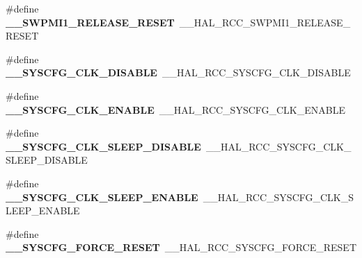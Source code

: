 \begin{DoxyCompactItemize}
\item 
\#define {\bfseries \+\_\+\+\_\+\+S\+W\+P\+M\+I1\+\_\+\+R\+E\+L\+E\+A\+S\+E\+\_\+\+R\+E\+S\+ET}~\+\_\+\+\_\+\+H\+A\+L\+\_\+\+R\+C\+C\+\_\+\+S\+W\+P\+M\+I1\+\_\+\+R\+E\+L\+E\+A\+S\+E\+\_\+\+R\+E\+S\+ET\hypertarget{group___h_a_l___r_c_c___aliased_ga7284a029f95a64809fe509d99fbce6f2}{}\label{group___h_a_l___r_c_c___aliased_ga7284a029f95a64809fe509d99fbce6f2}

\item 
\#define {\bfseries \+\_\+\+\_\+\+S\+Y\+S\+C\+F\+G\+\_\+\+C\+L\+K\+\_\+\+D\+I\+S\+A\+B\+LE}~\+\_\+\+\_\+\+H\+A\+L\+\_\+\+R\+C\+C\+\_\+\+S\+Y\+S\+C\+F\+G\+\_\+\+C\+L\+K\+\_\+\+D\+I\+S\+A\+B\+LE\hypertarget{group___h_a_l___r_c_c___aliased_gaf304a1951b4254ea8aa1ee909338cd55}{}\label{group___h_a_l___r_c_c___aliased_gaf304a1951b4254ea8aa1ee909338cd55}

\item 
\#define {\bfseries \+\_\+\+\_\+\+S\+Y\+S\+C\+F\+G\+\_\+\+C\+L\+K\+\_\+\+E\+N\+A\+B\+LE}~\+\_\+\+\_\+\+H\+A\+L\+\_\+\+R\+C\+C\+\_\+\+S\+Y\+S\+C\+F\+G\+\_\+\+C\+L\+K\+\_\+\+E\+N\+A\+B\+LE\hypertarget{group___h_a_l___r_c_c___aliased_gade2f257c0606454f62a43e92c9f4da16}{}\label{group___h_a_l___r_c_c___aliased_gade2f257c0606454f62a43e92c9f4da16}

\item 
\#define {\bfseries \+\_\+\+\_\+\+S\+Y\+S\+C\+F\+G\+\_\+\+C\+L\+K\+\_\+\+S\+L\+E\+E\+P\+\_\+\+D\+I\+S\+A\+B\+LE}~\+\_\+\+\_\+\+H\+A\+L\+\_\+\+R\+C\+C\+\_\+\+S\+Y\+S\+C\+F\+G\+\_\+\+C\+L\+K\+\_\+\+S\+L\+E\+E\+P\+\_\+\+D\+I\+S\+A\+B\+LE\hypertarget{group___h_a_l___r_c_c___aliased_gaec495cd65b4cd9c5794dc26ab0a99cb8}{}\label{group___h_a_l___r_c_c___aliased_gaec495cd65b4cd9c5794dc26ab0a99cb8}

\item 
\#define {\bfseries \+\_\+\+\_\+\+S\+Y\+S\+C\+F\+G\+\_\+\+C\+L\+K\+\_\+\+S\+L\+E\+E\+P\+\_\+\+E\+N\+A\+B\+LE}~\+\_\+\+\_\+\+H\+A\+L\+\_\+\+R\+C\+C\+\_\+\+S\+Y\+S\+C\+F\+G\+\_\+\+C\+L\+K\+\_\+\+S\+L\+E\+E\+P\+\_\+\+E\+N\+A\+B\+LE\hypertarget{group___h_a_l___r_c_c___aliased_ga8c0a2b49a38b694b40590201c0798236}{}\label{group___h_a_l___r_c_c___aliased_ga8c0a2b49a38b694b40590201c0798236}

\item 
\#define {\bfseries \+\_\+\+\_\+\+S\+Y\+S\+C\+F\+G\+\_\+\+F\+O\+R\+C\+E\+\_\+\+R\+E\+S\+ET}~\+\_\+\+\_\+\+H\+A\+L\+\_\+\+R\+C\+C\+\_\+\+S\+Y\+S\+C\+F\+G\+\_\+\+F\+O\+R\+C\+E\+\_\+\+R\+E\+S\+ET\hypertarget{group___h_a_l___r_c_c___aliased_ga4beacdd25611c64ffc04f6b7e6981e65}{}\label{group___h_a_l___r_c_c___aliased_ga4beacdd25611c64ffc04f6b7e6981e65}


\end{DoxyCompactItemize}
